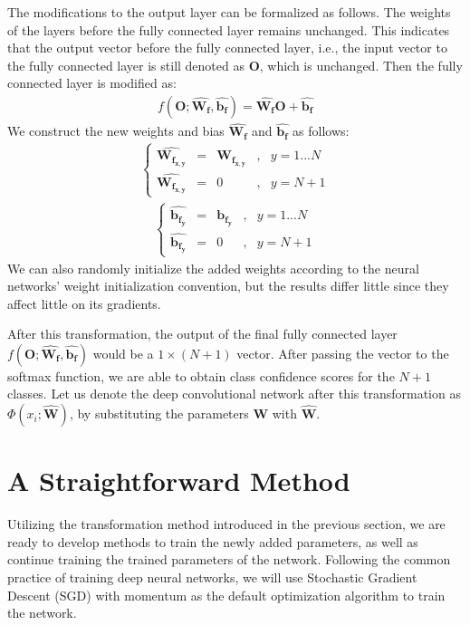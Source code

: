 The modifications to the output layer can be formalized as follows. The weights of the layers before the fully connected layer remains unchanged. This indicates that the output vector before the fully connected layer, i.e., the input vector to the fully connected layer is still denoted as $\mathbf{O}$, which is unchanged. Then the fully connected layer is modified as:
\begin{align}
f(\mathbf{O}; \hat{\mathbf{W_f}}, \hat{\mathbf{b_f}}) =  \hat{\mathbf{W_f}}\mathbf{O} + \hat{\mathbf{b_f}}
\end{align}
We construct the new weights and bias $\hat{\mathbf{W_f}}$ and $\hat{\mathbf{b_f}}$ as follows:
\begin{align}
\left\{
	\begin{aligned}
	\hat{\mathbf{W_{f_{x,y}}}} & = & \mathbf{W_{f_{x,y}}}& ,& y = 1...N\\
	\hat{\mathbf{W_{f_{x,y}}}} & = & 0&,& y = N+1	
	\end{aligned}
\right.
\end{align}
\begin{align}
\left\{
\begin{aligned}
\hat{\mathbf{b_{f_{y}}}} & = & \mathbf{b_{f_{y}}}& ,& y = 1...N\\
\hat{\mathbf{b_{f_{y}}}} & = & 0&,& y = N+1	
\end{aligned}
\right.
\end{align}
We can also randomly initialize the added weights according to the neural networks' weight initialization convention, but the results differ little since they affect little on its gradients.

After this transformation, the output of the final fully connected layer $f(\mathbf{O}; \hat{\mathbf{W_f}}, \hat{\mathbf{b_f}})$ would be a $1\times (N+1)$ vector. After passing the vector to the softmax function, we are able to obtain class confidence scores for the $N+1$ classes. Let us denote the deep convolutional network after this transformation as $\Phi(x_i; \hat{\mathbf{W}})$, by substituting the parameters $\mathbf{W}$ with $\hat{\mathbf{W}}$.


\section{A Straightforward Method}

Utilizing the transformation method introduced in the previous section, we are ready to develop methods to train the newly added parameters, as well as continue training the trained parameters of the network. Following the common practice of training deep neural networks, we will use Stochastic Gradient Descent\cite{he2016deep} (SGD) with momentum\cite{sutskever2013importance} as the default optimization algorithm to train the network.

